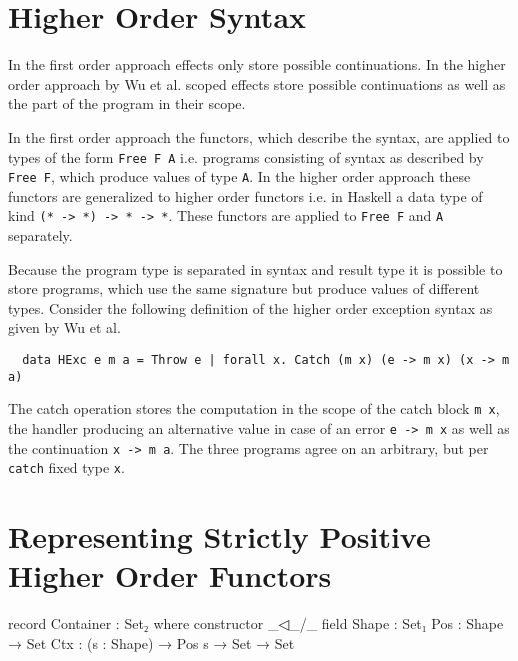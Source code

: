 \section{Higher Order Syntax}

In the first order approach effects only store possible continuations.
In the higher order approach by Wu et al. scoped effects store possible
continuations as well as the part of the program in their scope.

In the first order approach the functors, which describe the syntax, are applied
to types of the form \texttt{Free F A} i.e. programs consisting of syntax as
described by \texttt{Free F}, which produce values of type \texttt{A}.
In the higher order approach these functors are generalized to higher order
functors i.e. in Haskell a data type of kind \texttt{(* -> *) -> * -> *}.
These functors are applied to \texttt{Free F} and \texttt{A} separately.

Because the program type is separated in syntax and result type it is possible
to store programs, which use the same signature but produce values of different
types.
Consider the following definition of the higher order exception syntax as given
by Wu et al.

\begin{verbatim}
  data HExc e m a = Throw e | forall x. Catch (m x) (e -> m x) (x -> m a)
\end{verbatim}
The catch operation stores the computation in the scope of the catch block
\texttt{m x}, the handler producing an alternative value in case of an error
\texttt{e -> m x} as well as the continuation \texttt{x -> m a}.
The three programs agree on an arbitrary, but per \texttt{catch} fixed type
\texttt{x}.


\section{Representing Strictly Positive Higher Order Functors}

\begin{code}
record Container : Set₂ where
  constructor _◁_/_
  field
    Shape : Set₁
    Pos : Shape → Set
    Ctx : (s : Shape) → Pos s → Set → Set
\end{code}


